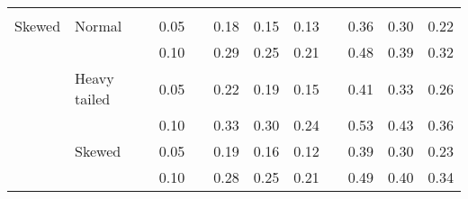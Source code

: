 \begin{table}[ht]
\begin{scriptsize}
\begin{tabular}{ll p{.1cm} c p{.1cm} rrr p{.1cm} rrr}
              &&&&&&&&&&&\\
Skewed       & Normal       && 0.05 &&  0.18 & 0.15 & 0.13 && 0.36 & 0.30 & 0.22 \\ 
             &              && 0.10 &&  0.29 & 0.25 & 0.21 && 0.48 & 0.39 & 0.32 \\ 
             & Heavy tailed && 0.05 &&  0.22 & 0.19 & 0.15 && 0.41 & 0.33 & 0.26 \\ 
             &              && 0.10 &&  0.33 & 0.30 & 0.24 && 0.53 & 0.43 & 0.36 \\ 
             & Skewed       && 0.05 &&  0.19 & 0.16 & 0.12 && 0.39 & 0.30 & 0.23 \\ 
             &              && 0.10 &&  0.28 & 0.25 & 0.21 && 0.49 & 0.40 & 0.34 \\

\hline
\end{tabular}
\end{scriptsize}
\end{table}


